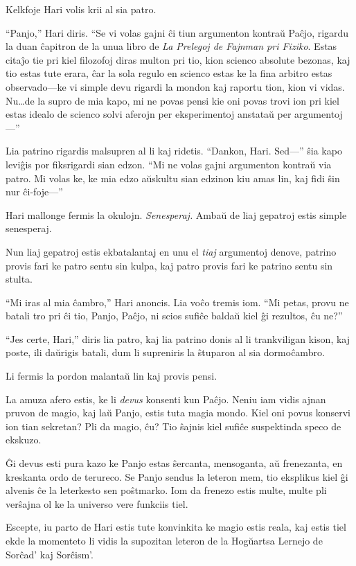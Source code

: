 Kelkfoje Hari volis krii al sia patro.

“Panjo,” Hari diris.
“Se vi volas gajni ĉi tiun argumenton kontraŭ Paĉjo, rigardu la duan ĉapitron de la unua libro de \emph{La Prelegoj de Fajnman pri Fiziko}.
Estas citaĵo tie pri kiel filozofoj diras multon pri tio, kion scienco absolute bezonas, kaj tio estas tute erara, ĉar la sola regulo en scienco estas ke la fina arbitro estas observado—ke vi simple devu rigardi la mondon kaj raportu tion, kion vi vidas.
Nu…de la supro de mia kapo, mi ne povas pensi kie oni povas trovi ion pri kiel estas idealo de scienco solvi aferojn per eksperimentoj anstataŭ per argumentoj—”

Lia patrino rigardis malsupren al li kaj ridetis.
“Dankon, Hari.
Sed—” ŝia kapo leviĝis por fiksrigardi sian edzon.
“Mi ne volas gajni argumenton kontraŭ via patro.
Mi volas ke, ke mia edzo aŭskultu sian edzinon kiu amas lin, kaj fidi ŝin nur ĉi-foje—”

Hari mallonge fermis la okulojn.
\emph{Senesperaj.}
Ambaŭ de liaj gepatroj estis simple senesperaj.

Nun liaj gepatroj estis ekbatalantaj en unu el \emph{tiaj} argumentoj denove, patrino provis fari ke patro sentu sin kulpa, kaj patro provis fari ke patrino sentu sin stulta.

“Mi iras al mia ĉambro,” Hari anoncis.
Lia voĉo tremis iom.
“Mi petas, provu ne batali tro pri ĉi tio, Panjo, Paĉjo, ni scios sufiĉe baldaŭ kiel ĝi rezultos, ĉu ne?”

“Jes certe, Hari,” diris lia patro, kaj lia patrino donis al li trankviligan kison, kaj poste, ili daŭrigis batali, dum li supreniris la ŝtuparon al sia dormoĉambro.

Li fermis la pordon malantaŭ lin kaj provis pensi.

La amuza afero estis, ke li \emph{devus} konsenti kun Paĉjo.
Neniu iam vidis ajnan pruvon de magio, kaj laŭ Panjo, estis tuta magia mondo.
Kiel oni povus konservi ion tian sekretan?
Pli da magio, ĉu?
Tio ŝajnis kiel sufiĉe suspektinda speco de ekskuzo.

Ĝi devus esti pura kazo ke Panjo estas ŝercanta, mensoganta, aŭ frenezanta, en kreskanta ordo de terureco.
Se Panjo sendus la leteron mem, tio eksplikus kiel ĝi alvenis ĉe la leterkesto sen poŝtmarko.
Iom da frenezo estis multe, multe pli verŝajna ol ke la universo vere funkciis tiel.

Escepte, iu parto de Hari estis tute konvinkita ke magio estis reala, kaj estis tiel ekde la momenteto li vidis la supozitan leteron de la Hogŭartsa Lernejo de Sorĉad’ kaj Sorĉism’.


